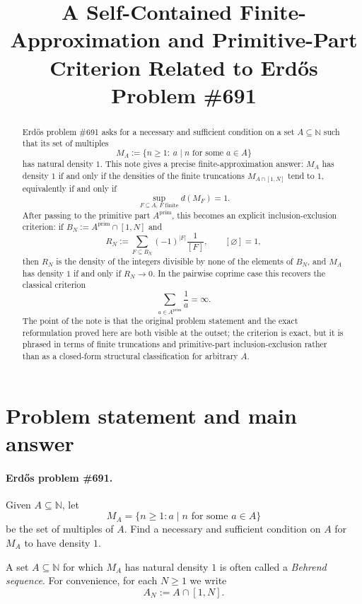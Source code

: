 \documentclass[11pt]{article}
\theoremstyle{definition}
\theoremstyle{remark}
\newcommand{\N}{\mathbb N}
\newcommand{\PP}{A^{\mathrm{prim}}}
\begin{document}
\title{A Self-Contained Finite-Approximation and Primitive-Part Criterion Related to Erd\H{o}s Problem \#691}
\author{}
\date{}
\maketitle

\begin{abstract}
Erd\H{o}s problem \#691 asks for a necessary and sufficient condition on a set
\(A\subseteq\N\) such that its set of multiples
\[
M_A:=\{n\ge 1:\ a\mid n\text{ for some }a\in A\}
\]
has natural density \(1\).
This note gives a precise finite-approximation answer:
\(M_A\) has density \(1\) if and only if the densities of the finite truncations
\(M_{A\cap[1,N]}\) tend to \(1\), equivalently if and only if
\[
\sup_{F\subseteq A,\,F\text{ finite}} d(M_F)=1.
\]
After passing to the primitive part \(\PP\), this becomes an explicit inclusion-exclusion criterion:
if \(B_N:=\PP\cap[1,N]\) and
\[
R_N:=\sum_{F\subseteq B_N} (-1)^{|F|}\frac1{[F]},
\qquad [\varnothing]=1,
\]
then \(R_N\) is the density of the integers divisible by none of the elements of \(B_N\), and
\(M_A\) has density \(1\) if and only if \(R_N\to 0\).
In the pairwise coprime case this recovers the classical criterion
\[
\sum_{a\in \PP}\frac1a=\infty.
\]
The point of the note is that the original problem statement and the exact reformulation proved here are both visible at the outset; the criterion is exact, but it is phrased in terms of finite truncations and primitive-part inclusion-exclusion rather than as a closed-form structural classification for arbitrary \(A\).
\end{abstract}

\section{Problem statement and main answer}

\paragraph{Erd\H{o}s problem \#691.}
Given \(A\subseteq \N\), let
\[
M_A=\{ n \geq 1 : a\mid n\text{ for some }a\in A\}
\]
be the set of multiples of \(A\).
Find a necessary and sufficient condition on \(A\) for \(M_A\) to have density \(1\).

\medskip
A set \(A\subseteq\N\) for which \(M_A\) has natural density \(1\) is often called a \emph{Behrend sequence}.
For convenience, for each \(N\ge 1\) we write
\[
A_N:=A\cap[1,N].
\]
\end{document}
